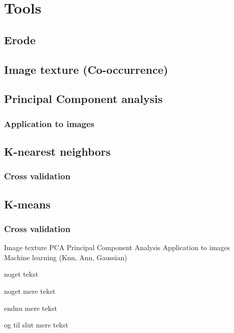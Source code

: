 \chapter{Tools}

\section{Erode}

\section{Image texture (Co-occurrence)}

\section{Principal Component analysis}

\subsection{Application to images}

\section{K-nearest neighbors}

\subsection{Cross validation}

\section{K-means}

\subsection{Cross validation}



Image texture
PCA
Principal Component Analysis Application to images
Machine learning (Knn, Ann, Gaussian)


\small
noget tekst 

noget mere tekst 

endnu mere tekst 

og til slut mere tekst 
